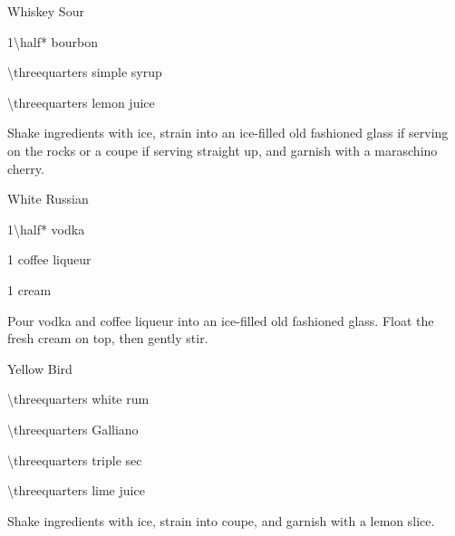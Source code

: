 \begin{Cocktail}{Whiskey Sour}
	\begin{Ingredients}
	\item \SI{1\half*}{\oz} bourbon
	\item \SI{\threequarters}{\oz} simple syrup
	\item \SI{\threequarters}{\oz} lemon juice
	\end{Ingredients}
	
	\begin{Instructions}
	Shake ingredients with ice, strain into an ice-filled old fashioned glass if serving on the rocks or a coupe if serving straight up, and garnish with a maraschino cherry.	
	\end{Instructions}
\end{Cocktail}

\begin{Cocktail}{White Russian}
	\begin{Ingredients}
	\item \SI{1\half*}{\oz} vodka
	\item \SI{1}{\oz} coffee liqueur
	\item \SI{1}{\oz} cream
	\end{Ingredients}
	
	\begin{Instructions}
	Pour vodka and coffee liqueur into an ice-filled old fashioned glass.  Float the fresh cream on top, then gently stir.
	\end{Instructions}
\end{Cocktail}

\begin{Cocktail}{Yellow Bird}
	\begin{Ingredients}
	\item \SI{\threequarters}{\oz} white rum
	\item \SI{\threequarters}{\oz} Galliano
	\item \SI{\threequarters}{\oz} triple sec
	\item \SI{\threequarters}{\oz} lime juice
	\end{Ingredients}
	
	\begin{Instructions}
	Shake ingredients with ice, strain into coupe, and garnish with a lemon slice.
	\end{Instructions}
\end{Cocktail}

